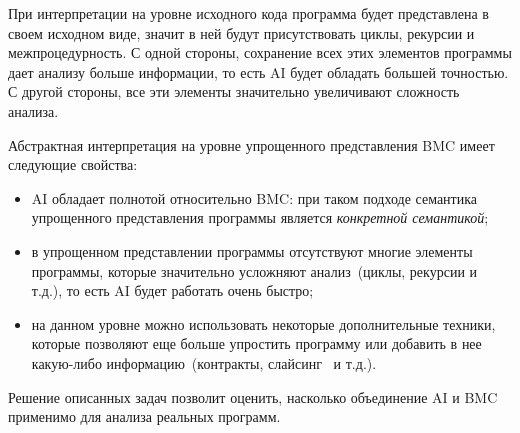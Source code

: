 При интерпретации на уровне исходного кода программа будет представлена в своем
исходном виде, значит в ней будут присутствовать циклы, рекурсии и 
межпроцедурность. С одной стороны, сохранение всех этих элементов программы 
дает анализу больше информации, то есть AI будет обладать большей точностью. С 
другой стороны, все эти элементы значительно увеличивают сложность анализа.

Абстрактная интерпретация на уровне упрощенного представления BMC имеет 
следующие свойства:
\begin{itemize}
\item AI обладает полнотой относительно BMC: при таком подходе семантика
упрощенного представления программы является \emph{конкретной семантикой};
\item в упрощенном представлении программы отсутствуют многие элементы 
программы, которые значительно усложняют анализ~(циклы, рекурсии и т.д.), то 
есть AI будет работать очень быстро;
\item на данном уровне можно использовать некоторые дополнительные техники,
которые позволяют еще больше упростить программу или добавить в нее какую-либо
информацию~(контракты, слайсинг~\cite{slicing} и т.д.).
\end{itemize}

Решение описанных задач позволит оценить, насколько объединение AI и BMC 
применимо для анализа реальных программ.

